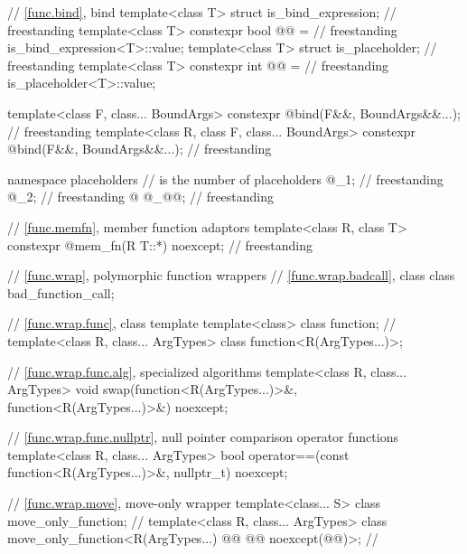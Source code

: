 \begin{codeblock}
{  // \ref{func.bind}, bind
  template<class T> struct is_bind_expression;                                      // freestanding
  template<class T>
    constexpr bool @@ =                                           // freestanding
      is_bind_expression<T>::value;
  template<class T> struct is_placeholder;                                          // freestanding
  template<class T>
    constexpr int @@ =                                                // freestanding
      is_placeholder<T>::value;

  template<class F, class... BoundArgs>
    constexpr @\unspec@ bind(F&&, BoundArgs&&...);                                // freestanding
  template<class R, class F, class... BoundArgs>
    constexpr @\unspec@ bind(F&&, BoundArgs&&...);                                // freestanding

  namespace placeholders {
    //  is the  number of placeholders
    @\seebelownc@ _1;                                                                   // freestanding
    @\seebelownc@ _2;                                                                   // freestanding
               @\vdots@
    @\seebelownc@ _@@;                                                                   // freestanding
  }

  // \ref{func.memfn}, member function adaptors
  template<class R, class T>
    constexpr @\unspec@ mem_fn(R T::*) noexcept;                                  // freestanding

  // \ref{func.wrap}, polymorphic function wrappers
  // \ref{func.wrap.badcall}, class 
  class bad_function_call;

  // \ref{func.wrap.func}, class template 
  template<class> class function;       // \notdef
  template<class R, class... ArgTypes> class function<R(ArgTypes...)>;

  // \ref{func.wrap.func.alg},  specialized algorithms
  template<class R, class... ArgTypes>
    void swap(function<R(ArgTypes...)>&, function<R(ArgTypes...)>&) noexcept;

  // \ref{func.wrap.func.nullptr},  null pointer comparison operator functions
  template<class R, class... ArgTypes>
    bool operator==(const function<R(ArgTypes...)>&, nullptr_t) noexcept;

  // \ref{func.wrap.move}, move-only wrapper
  template<class... S> class move_only_function;                        // \notdef
  template<class R, class... ArgTypes>
    class move_only_function<R(ArgTypes...) @\cv{}\itcorr[-1]@ @@ noexcept(@@)>;     // \seebelow

}
\end{codeblock}
